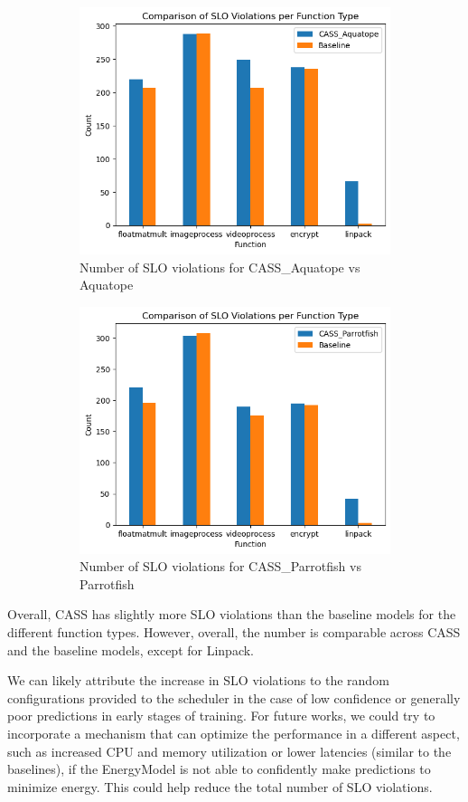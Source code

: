 \documentclass[times, 10pt,twocolumn]{article}
\begin{document}
\begin{figure}[H] %
   \centering
   \begin{subfigure}[b]{0.5\textwidth} %
         \centering
         \includegraphics[width=0.6\linewidth]{imgs/final_experiment_plots/duration_comparison/aquatope.png}
         \caption{Number of SLO violations for CASS\_Aquatope vs Aquatope}
         \label{fig:cassvsaquatope_slo}
   \end{subfigure}
   \begin{subfigure}[b]{0.5\textwidth} %
         \centering
         \includegraphics[width=0.6\linewidth]{imgs/final_experiment_plots/duration_comparison/parrotfish.png}
         \caption{Number of SLO violations for CASS\_Parrotfish vs Parrotfish}
         \label{fig:cassvsparrotfish_slo}
   \end{subfigure}
   \caption{}
\end{figure}

Overall, CASS has slightly more SLO violations than the baseline models for the different function types. However, overall, the number is comparable across CASS and the baseline models, except for Linpack. 

We can likely attribute the increase in SLO violations to the random configurations provided to the scheduler in the case of low confidence or generally poor predictions in early stages of training. For future works, we could try to incorporate a mechanism that can optimize the performance in a different aspect, such as increased CPU and memory utilization or lower latencies (similar to the baselines), if the EnergyModel is not able to confidently make predictions to minimize energy. This could help reduce the total number of SLO violations. 
\end{document}

